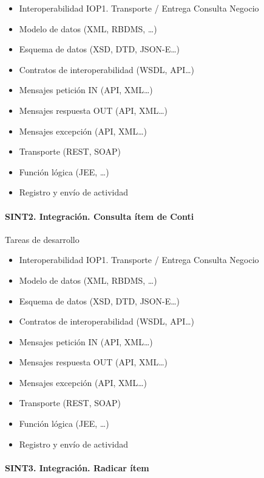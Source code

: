 \documentclass[
  paper=a4,
  ,captions=tableheading
]{scrartcl}
\providecommand{\tightlist}{%
  \setlength{\itemsep}{0pt}\setlength{\parskip}{0pt}}
\begin{document}
\begin{itemize}
\tightlist
\item
  Interoperabilidad IOP1. Transporte / Entrega Consulta Negocio
\item
  Modelo de datos (XML, RBDMS, \ldots)
\item
  Esquema de datos (XSD, DTD, JSON-E\ldots)
\item
  Contratos de interoperabilidad (WSDL, API\ldots)
\item
  Mensajes petición IN (API, XML\ldots)
\item
  Mensajes respuesta OUT (API, XML\ldots)
\item
  Mensajes excepción (API, XML\ldots)
\item
  Transporte (REST, SOAP)
\item
  Función lógica (JEE, \ldots)
\item
  Registro y envío de actividad
\end{itemize}

\paragraph{SINT2. Integración. Consulta ítem de
Conti}\label{sec:sint2.-integraciuxf3n.-consulta-uxedtem-de-conti}

Tareas de desarrollo

\begin{itemize}
\tightlist
\item
  Interoperabilidad IOP1. Transporte / Entrega Consulta Negocio
\item
  Modelo de datos (XML, RBDMS, \ldots)
\item
  Esquema de datos (XSD, DTD, JSON-E\ldots)
\item
  Contratos de interoperabilidad (WSDL, API\ldots)
\item
  Mensajes petición IN (API, XML\ldots)
\item
  Mensajes respuesta OUT (API, XML\ldots)
\item
  Mensajes excepción (API, XML\ldots)
\item
  Transporte (REST, SOAP)
\item
  Función lógica (JEE, \ldots)
\item
  Registro y envío de actividad
\end{itemize}

\paragraph{SINT3. Integración. Radicar
ítem}\label{sec:sint3.-integraciuxf3n.-radicar-uxedtem}
\end{document}
